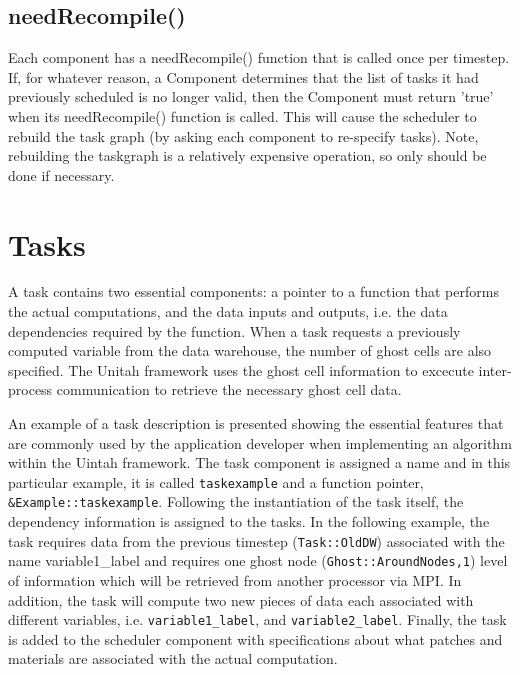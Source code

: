 \documentclass[12pt]{report}
\begin{document}
\subsection{needRecompile()}


Each component has a needRecompile() function that is called once per
timestep.  If, for whatever reason, a Component determines that the
list of tasks it had previously scheduled is no longer valid, then the
Component must return 'true' when its needRecompile() function is
called.  This will cause the scheduler to rebuild the task graph (by
asking each component to re-specify tasks).  Note, rebuilding the
taskgraph is a relatively expensive operation, so only should be done
if necessary.

\section{Tasks}

A task contains two essential components: a pointer to a function
that performs the actual computations, and the data inputs and
outputs, i.e. the data dependencies required by the function.  When a
task requests a previously computed variable from the data warehouse,
the number of ghost cells are also specified.  The Unitah framework
uses the ghost cell information to excecute inter-process
communication to retrieve the necessary ghost cell data.

An example of a task description is presented showing the essential
features that are commonly used by the application developer when
implementing an algorithm within the Uintah framework.  The task
component is assigned a name and in this particular example, it is
called \texttt{taskexample} and a function pointer,
\texttt{\&Example::taskexample}.  Following the instantiation of the
task itself, the dependency information is assigned to the tasks.  In
the following example, the task requires data from the previous
timestep (\texttt{Task::OldDW}) associated with the name
variable1\_label and requires one ghost node
(\texttt{Ghost::AroundNodes,1}) level of information which will be
retrieved from another processor via MPI.  In addition, the task will
compute two new pieces of data each associated with different
variables, i.e. \texttt{variable1\_label}, and
\texttt{variable2\_label}.  Finally, the task is added to the scheduler
component with specifications about what patches and materials are
associated with the actual computation.
\end{document}
